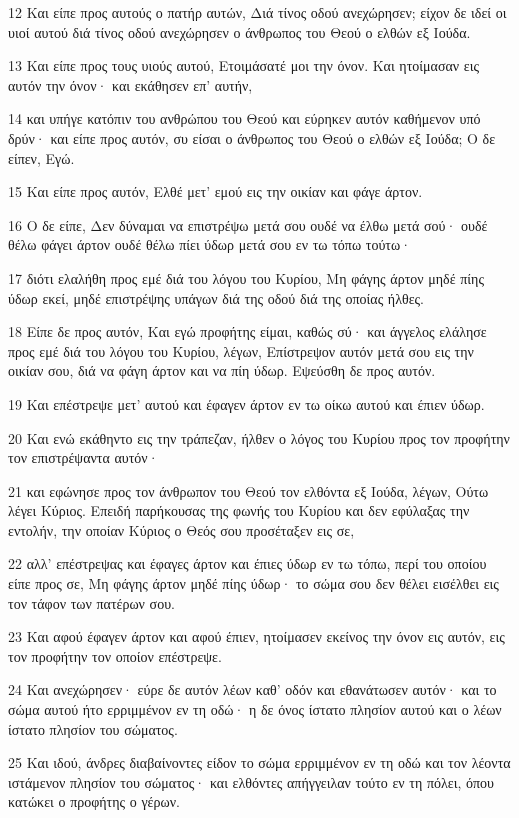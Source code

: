 \par 12 Και είπε προς αυτούς ο πατήρ αυτών, Διά τίνος οδού ανεχώρησεν; είχον δε ιδεί οι υιοί αυτού διά τίνος οδού ανεχώρησεν ο άνθρωπος του Θεού ο ελθών εξ Ιούδα.
\par 13 Και είπε προς τους υιούς αυτού, Ετοιμάσατέ μοι την όνον. Και ητοίμασαν εις αυτόν την όνον· και εκάθησεν επ' αυτήν,
\par 14 και υπήγε κατόπιν του ανθρώπου του Θεού και εύρηκεν αυτόν καθήμενον υπό δρύν· και είπε προς αυτόν, συ είσαι ο άνθρωπος του Θεού ο ελθών εξ Ιούδα; Ο δε είπεν, Εγώ.
\par 15 Και είπε προς αυτόν, Ελθέ μετ' εμού εις την οικίαν και φάγε άρτον.
\par 16 Ο δε είπε, Δεν δύναμαι να επιστρέψω μετά σου ουδέ να έλθω μετά σού· ουδέ θέλω φάγει άρτον ουδέ θέλω πίει ύδωρ μετά σου εν τω τόπω τούτω·
\par 17 διότι ελαλήθη προς εμέ διά του λόγου του Κυρίου, Μη φάγης άρτον μηδέ πίης ύδωρ εκεί, μηδέ επιστρέψης υπάγων διά της οδού διά της οποίας ήλθες.
\par 18 Είπε δε προς αυτόν, Και εγώ προφήτης είμαι, καθώς σύ· και άγγελος ελάλησε προς εμέ διά του λόγου του Κυρίου, λέγων, Επίστρεψον αυτόν μετά σου εις την οικίαν σου, διά να φάγη άρτον και να πίη ύδωρ. Εψεύσθη δε προς αυτόν.
\par 19 Και επέστρεψε μετ' αυτού και έφαγεν άρτον εν τω οίκω αυτού και έπιεν ύδωρ.
\par 20 Και ενώ εκάθηντο εις την τράπεζαν, ήλθεν ο λόγος του Κυρίου προς τον προφήτην τον επιστρέψαντα αυτόν·
\par 21 και εφώνησε προς τον άνθρωπον του Θεού τον ελθόντα εξ Ιούδα, λέγων, Ούτω λέγει Κύριος. Επειδή παρήκουσας της φωνής του Κυρίου και δεν εφύλαξας την εντολήν, την οποίαν Κύριος ο Θεός σου προσέταξεν εις σε,
\par 22 αλλ' επέστρεψας και έφαγες άρτον και έπιες ύδωρ εν τω τόπω, περί του οποίου είπε προς σε, Μη φάγης άρτον μηδέ πίης ύδωρ· το σώμα σου δεν θέλει εισέλθει εις τον τάφον των πατέρων σου.
\par 23 Και αφού έφαγεν άρτον και αφού έπιεν, ητοίμασεν εκείνος την όνον εις αυτόν, εις τον προφήτην τον οποίον επέστρεψε.
\par 24 Και ανεχώρησεν· εύρε δε αυτόν λέων καθ' οδόν και εθανάτωσεν αυτόν· και το σώμα αυτού ήτο ερριμμένον εν τη οδώ· η δε όνος ίστατο πλησίον αυτού και ο λέων ίστατο πλησίον του σώματος.
\par 25 Και ιδού, άνδρες διαβαίνοντες είδον το σώμα ερριμμένον εν τη οδώ και τον λέοντα ιστάμενον πλησίον του σώματος· και ελθόντες απήγγειλαν τούτο εν τη πόλει, όπου κατώκει ο προφήτης ο γέρων.
